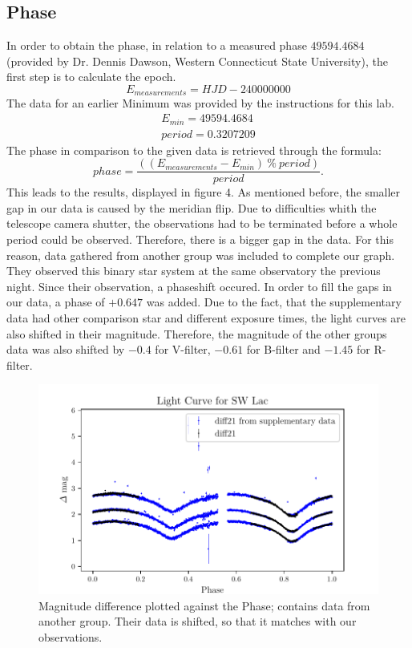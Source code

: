 \subsection{Phase}
  \label{sec:again}
  In order to obtain the phase, in relation to a measured phase $49594.4684$ (provided by Dr. Dennis Dawson, Western Connecticut State University), the first step is to calculate the epoch.
  \begin{equation*}
    E_{measurements} = HJD - 240000000
  \end{equation*}
  The data for an earlier Minimum was provided by the 
  instructions for this lab. 
  \begin{align*}
    E_{min} = 49594.4684\\
    period = 0.3207209
  \end{align*}
  The phase in comparison to the given data is retrieved through the formula:
  \begin{equation}
    phase = \dfrac{((E_{measurements}-E_{min})\ \% \ period)}{period}.
  \end{equation}
  This leads to the results, displayed in figure 4. As mentioned before, the smaller gap in our data is caused by the meridian flip. 
  Due to difficulties whith the telescope camera shutter, the observations had to be terminated
  before a whole period could be observed. Therefore, there is a bigger gap in the 
  data. For this reason, data gathered from another group was included to complete our graph. 
  They observed this binary star system at the same observatory the previous night. Since their
  observation, a phaseshift occured. In order to fill the gaps in our data,
  a phase of $+0.647$ was added. Due to the fact, that the supplementary data had other 
  comparison star and different exposure times, the light curves are also shifted in their
  magnitude. Therefore, the magnitude of the other groups data was also shifted
  by $-0.4$ for V-filter, $-0.61$ for B-filter and $-1.45$ for R-filter.\\
  \begin{figure}[H]
    \centering
    \includegraphics{gdPhase.pdf}
    \caption{Magnitude difference plotted against the Phase; contains data from another group. Their data is shifted, so that it matches with our observations.}
    \label{fig:phase}
  \end{figure}
 
